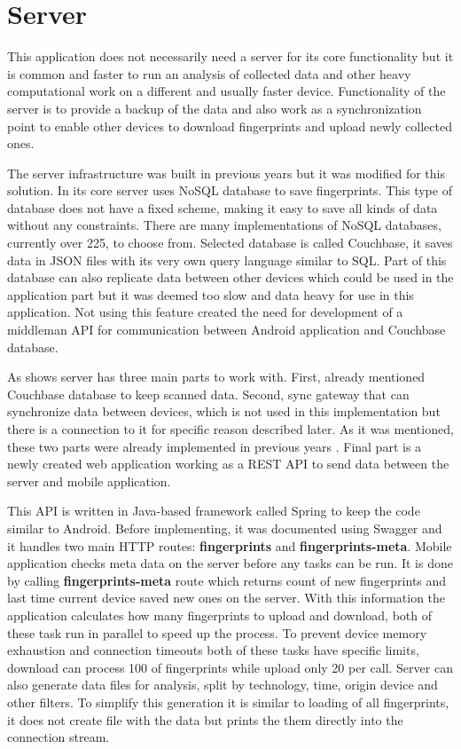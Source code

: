 \section{Server}\label{sec:Server}
This application does not necessarily need a server for its core functionality but it is common and faster to run an analysis of collected data and other heavy computational work on a different and usually faster device. Functionality of the server is to provide a backup of the data and also work as a synchronization point to enable other devices to download fingerprints and upload newly collected ones.

The server infrastructure was built in previous years \cite{IILUBLEB} but it was modified for this solution. In its core server uses NoSQL database to save fingerprints. This type of database does not have a fixed scheme, making it easy to save all kinds of data without any constraints. There are many implementations of NoSQL databases, currently over 225, to choose from. Selected database is called Couchbase, it saves data in JSON files with its very own query language similar to SQL. Part of this database can also replicate data between other devices which could be used in the application part but it was deemed too slow and data heavy for use in this application. Not using this feature created the need for development of a middleman API for communication between Android application and Couchbase database.

As  shows server has three main parts to work with. First, already mentioned Couchbase database to keep scanned data. Second, sync gateway that can synchronize data between devices, which is not used in this implementation but there is a connection to it for specific reason described later. As it was mentioned, these two parts were already implemented in previous years \cite{IILUBLEB}. Final part is a newly created web application working as a REST API to send data between the server and mobile application. 

This API is written in Java-based framework called Spring to keep the code similar to Android. Before implementing, it was documented using Swagger and it handles two main HTTP routes: \textbf{fingerprints} and \textbf{fingerprints-meta}. Mobile application checks meta data on the server before any tasks can be run. It is done by calling \textbf{fingerprints-meta} route which returns count of new fingerprints and last time current device saved new ones on the server. With this information the application calculates how many fingerprints to upload and download, both of these task run in parallel to speed up the process. To prevent device memory exhaustion and connection timeouts both of these tasks have specific limits, download can process 100 of fingerprints while upload only 20 per call. Server can also generate data files for analysis, split by technology, time, origin device and other filters. To simplify this generation it is similar to loading of all fingerprints, it does not create file with the data but prints the them directly into the connection stream.

